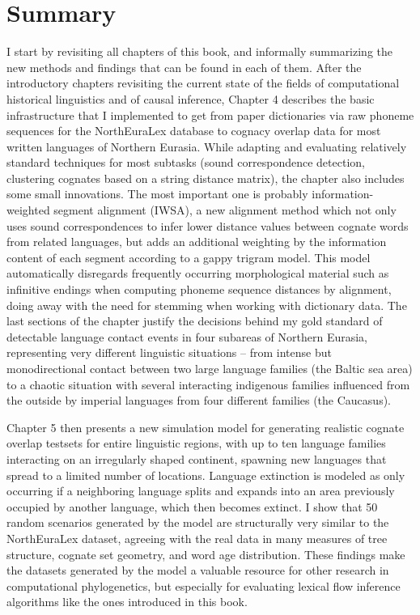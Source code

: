 \section{Summary}
I start by revisiting all chapters of this book, and informally summarizing the new methods and findings that can be found in each of them. After the introductory chapters revisiting the current state of the fields of computational historical linguistics and of causal inference, Chapter 4 describes the basic infrastructure that I implemented to get from paper dictionaries via raw phoneme sequences for the NorthEuraLex database to cognacy overlap data for most written languages of Northern Eurasia. While adapting and evaluating relatively standard techniques for most subtasks (sound correspondence detection, clustering cognates based on a string distance matrix), the chapter also includes some small innovations. The most important one is probably information-weighted segment alignment (IWSA), a new alignment method which not only uses sound correspondences to infer lower distance values between cognate words from related languages, but adds an additional weighting by the information content of each segment 
according to a gappy trigram model. This model automatically disregards frequently occurring morphological material such as infinitive endings when computing phoneme sequence distances by alignment, doing away with the need for stemming when working with dictionary data. The last sections of the chapter justify the decisions behind my gold standard of detectable language contact events in four subareas of Northern Eurasia, representing very different linguistic situations -- from intense but monodirectional contact between two large language families (the Baltic sea area) to a chaotic situation with several interacting indigenous families influenced from the outside by imperial languages from four different families (the Caucasus).

Chapter 5 then presents a new simulation model for generating realistic cognate overlap testsets for entire linguistic regions, with up to ten language families interacting on an irregularly shaped continent, spawning new languages that spread to a limited number of locations. Language extinction is modeled as only occurring if a neighboring language splits and expands into an area previously occupied by another language, which then becomes extinct. I show that 50 random scenarios generated by the model are structurally very similar to the NorthEuraLex dataset, agreeing with the real data in many measures of tree structure, cognate set geometry, and word age distribution. These findings make the datasets generated by the model a valuable resource for other research in computational phylogenetics, but especially for evaluating lexical flow inference algorithms like the ones introduced in this book.

